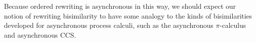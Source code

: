 Because ordered rewriting is asynchronous in this way, we should expect our notion of rewriting bisimilarity to have some analogy to the kinds of bisimilarities developed for asynchronous process calculi, such as the asynchronous $\pi$-calculus\autocite{Amadio+:TCS98} and asynchronous \acs*{CCS}\autocite{Boreale+:IC02}.










